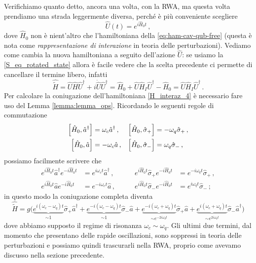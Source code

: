 \noindent Verifichiamo quanto detto, ancora una volta, con la RWA, ma questa volta prendiamo una strada leggermente diversa, perché è più conveniente scegliere
\begin{equation*}
    \hat U(t) = e^{i\hat H_0 t} \, ,
\end{equation*}
dove $\hat H_0$ non è nient'altro che l'hamiltoniana della \eqref{eq:ham-cav-qub-free} (questa è nota come \textit{rappresentazione di interazione} in teoria delle perturbazioni). Vediamo come cambia la nuova hamiltoniana a seguito dell'azione $\hat U$: se usiamo la \eqref{S_eq_rotated_state} allora è facile vedere che la scelta precedente ci permette di cancellare il termine libero, infatti
\begin{equation*}
    \hat{\tilde{H}} = \hat U \hat H \hat U^\dagger + i\dot{\hat U}\hat U^\dagger=\hat H_0 + \hat U \hat H_I \hat U^\dagger - \hat H_0= \hat U \hat H_I \hat U^\dagger \, .
\end{equation*}
Per calcolare la coniugazione dell'hamiltoniana \eqref{H_interaz_4} è necessario fare uso del Lemma \ref{lemma:lemma_ops}. Ricordando le seguenti regole di commutazione
\begin{align*}
    \comm{\hat H_0}{\hat a^\dagger} &= \omega_c \hat a^\dagger \, , 
    &\comm{\hat H_0}{\hat \sigma_+} &= -\omega_q\hat \sigma_+ \, , \\
    \comm{\hat H_0}{\hat a} &= -\omega_c \hat a \, , &\comm{\hat H_0}{\hat \sigma_-} &= \omega_q\hat \sigma_- \, ,
\end{align*}
possiamo facilmente scrivere che
\begin{equation}\label{RWA_ops_trans}
    \begin{aligned}
    e^{i\hat H_0t} \hat a^\dagger e^{-i\hat H_0t} &= e^{i\omega_ct} \hat a^\dagger \, , \qquad
    &e^{i\hat H_0t} \hat \sigma_+ e^{-i\hat H_0t} &= e^{-i\omega_qt} \hat \sigma_+ \, , \\
    e^{i\hat H_0t} \hat a e^{-i\hat H_0t} &= e^{-i\omega_ct} \hat a \, , \qquad
    &e^{i\hat H_0t} \hat \sigma_- e^{-i\hat H_0t} &= e^{i\omega_qt} \hat \sigma_- \, ;
    \end{aligned}
\end{equation}
in questo modo la coniugazione completa diventa
\begin{equation*}
    \hat{\tilde{H}} = g \Big( 
    \underbrace{e^{i(\omega_c - \omega_q)t}}_{\sim 1}\hat \sigma_+\hat a^\dagger +
    \underbrace{e^{-i(\omega_c - \omega_q)t}}_{\sim 1}\hat \sigma_-\hat a +
    \underbrace{e^{-i(\omega_c + \omega_q)t}}_{\sim e^{-2i\omega_qt}}\hat \sigma_+\hat a +
    \underbrace{e^{i(\omega_c + \omega_q)t}}_{\sim e^{2i\omega_qt}}\hat \sigma_-\hat a^\dag
    \Big)
\end{equation*}
dove abbiamo supposto il regime di risonanza $\omega_c \sim \omega_q$. Gli ultimi due termini, dal momento che presentano delle rapide oscillazioni, sono soppressi in teoria delle perturbazioni e possiamo quindi trascurarli nella RWA, proprio come avevamo discusso nella sezione precedente.

